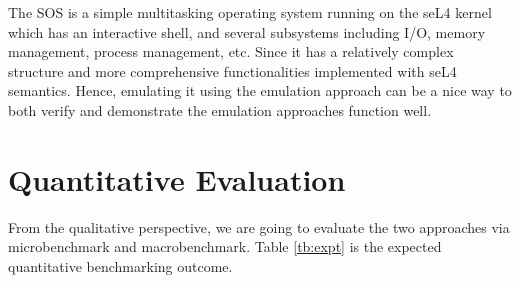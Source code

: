 The SOS is a simple multitasking operating system running on the seL4 kernel which has an interactive shell, and several subsystems including I/O, memory management, process management, etc. Since it has a relatively complex structure and more comprehensive functionalities implemented with seL4 semantics. Hence, emulating it using the emulation approach can be a nice way to both verify and demonstrate the emulation approaches function well.

\section{Quantitative Evaluation}

From the qualitative perspective, we are going to evaluate the two approaches via microbenchmark and macrobenchmark. Table \ref{tb:expt} is the expected quantitative benchmarking outcome.

\begin{table}[]
\centering
\caption{Expected success criteria}
\label{tb:expt}
\end{table}

